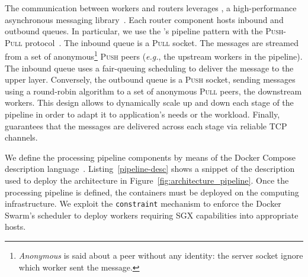 The communication between workers and routers leverages \zmq, a high-performance asynchronous messaging library~\cite{zero_mq}.
Each router component hosts inbound and outbound queues.
In particular, we use the \zmq's pipeline pattern with the \textsc{Push}-\textsc{Pull} protocol~\cite{zero_mq:pipeline}. 
The inbound queue is a \textsc{Pull} socket.
The messages are streamed from a set of anonymous\footnote{\emph{Anonymous} is said about a peer without any identity: the server socket ignore which worker sent the message.} \textsc{Push} peers (\emph{e.g.}, the upstream workers in the pipeline).
The inbound queue uses a fair-queuing scheduling to deliver the message to the upper layer.
Conversely, the outbound queue is a \textsc{Push} socket, sending messages using a round-robin algorithm to a set of anonymous \textsc{Pull} peers, the downstream workers.
This design allows to dynamically scale up and down each stage of the pipeline in order to adapt it to application's needs or the workload.
Finally, \zmq guarantees that the messages are delivered across each stage via reliable TCP channels.

We define the processing pipeline components by means of the Docker Compose description language~\cite{docker:compose}.
Listing~\ref{pipeline-desc} shows a snippet of the description used to deploy the architecture in Figure~\ref{fig:architecture_pipeline}.
Once the processing pipeline is defined, the containers must be deployed on the computing infrastructure.
We exploit the \texttt{constraint} mechanism to enforce the Docker Swarm's scheduler to deploy workers requiring SGX capabilities into appropriate hosts.


